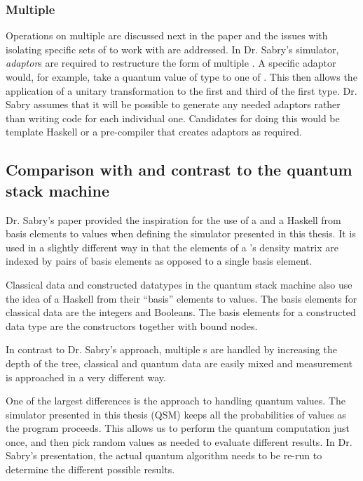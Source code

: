 \subsubsection{Multiple \qbits}
Operations on multiple \qbits{} are discussed next in the paper and the
issues with isolating specific sets of \qbits{} to work with are addressed.
In  Dr. Sabry's simulator, \emph{adaptor}s are required to 
restructure the form of multiple \qbits. A specific adaptor would,
for example, take a quantum value of type  to
one of . This then allows the application of 
a unitary transformation to the first and third \qbits{} of the first type.
Dr. Sabry assumes that it will be possible to generate any needed adaptors
rather than writing code for each individual one.
Candidates for doing this would be template Haskell or a pre-compiler that 
creates adaptors as required.
\subsection{Comparison with and contrast to the quantum stack machine}
Dr. Sabry's paper provided the inspiration for the use of a 
 and a Haskell 
 from basis elements to values
 when defining the simulator presented in this thesis. It is used in a 
slightly different way in that the elements of a \qbit{}'s density
matrix are indexed by pairs of basis elements as opposed to a 
single basis element. 

Classical data and constructed datatypes
 in the quantum stack machine also use 
the idea of a Haskell  from their 
``basis'' elements to values. The basis elements for classical data
are the integers and Booleans. The basis elements for a constructed data
type are the constructors together with bound nodes.

In contrast to Dr. Sabry's approach, multiple
\qbit{}s are handled by increasing the depth of the tree, classical and
quantum data are easily mixed and measurement is approached in a very 
different way.

One of the largest differences is the  approach to handling
quantum values. The simulator presented in 
this thesis (QSM)
keeps all the probabilities of values as the program proceeds. This allows 
us to perform the quantum computation just once, and then pick random 
values as needed to evaluate different results. In Dr. Sabry's presentation,
the actual quantum algorithm needs to be re-run to determine
the different possible results.
